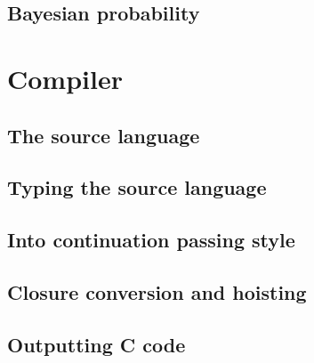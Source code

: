 \documentclass{article}
\begin{document}
\subsection{Bayesian probability}


\section{Compiler}

\subsection{The source language}

\subsection{Typing the source language}
\subsection{Into continuation passing style}
\subsection{Closure conversion and hoisting}
\subsection{Outputting C code}

\end{document}
